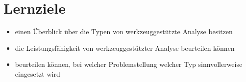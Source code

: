 \section{Lernziele}

\begin{itemize}
    \item einen Überblick über die Typen von werkzeuggestützte Analyse besitzen
    \item die Leistungsfähigkeit von werkzeuggestützter Analyse beurteilen können
    \item beurteilen können, bei welcher Problemstellung welcher Typ sinnvollerweise eingesetzt wird
\end{itemize}
